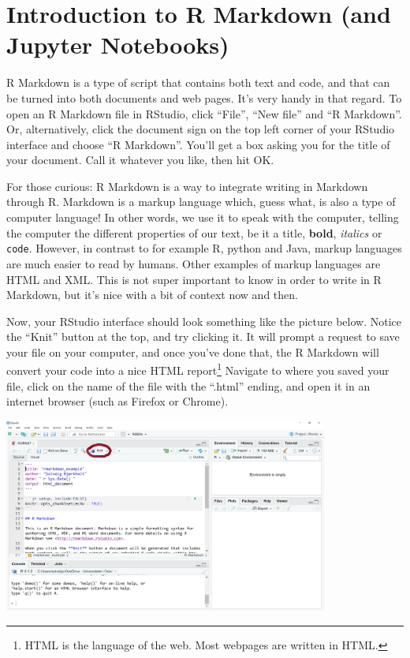\documentclass[
]{article}
\begin{document}
\hypertarget{introduction-to-r-markdown-and-jupyter-notebooks}{%
\section{Introduction to R Markdown (and Jupyter
Notebooks)}\label{introduction-to-r-markdown-and-jupyter-notebooks}}

R Markdown is a type of script that contains both text and code, and
that can be turned into both documents and web pages. It's very handy in
that regard. To open an R Markdown file in RStudio, click ``File'',
``New file'' and ``R Markdown''. Or, alternatively, click the document
sign on the top left corner of your RStudio interface and choose ``R
Markdown''. You'll get a box asking you for the title of your document.
Call it whatever you like, then hit OK.

For those curious: R Markdown is a way to integrate writing in Markdown
through R. Markdown is a markup language which, guess what, is also a
type of computer language! In other words, we use it to speak with the
computer, telling the computer the different properties of our text, be
it a title, \textbf{bold}, \emph{italics} or \texttt{code}. However, in
contrast to for example R, python and Java, markup languages are much
easier to read by humans. Other examples of markup languages are HTML
and XML. This is not super important to know in order to write in R
Markdown, but it's nice with a bit of context now and then.

Now, your RStudio interface should look something like the picture
below. Notice the ``Knit'' button at the top, and try clicking it. It
will prompt a request to save your file on your computer, and once
you've done that, the R Markdown will convert your code into a nice HTML
report\footnote{HTML is the language of the web. Most webpages are
  written in HTML.} Navigate to where you saved your file, click on the
name of the file with the ``.html'' ending, and open it in an internet
browser (such as Firefox or Chrome).

\includegraphics[width=0.8\textwidth,height=\textheight]{./figures/rmarkdown_2.png}
\end{document}
